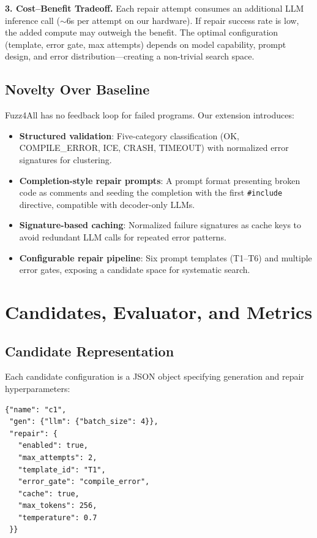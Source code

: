 \documentclass[conference]{IEEEtran}
\begin{document}
\textbf{3. Cost--Benefit Tradeoff.} Each repair attempt consumes an additional LLM inference call ($\sim$6s per attempt on our hardware). If repair success rate is low, the added compute may outweigh the benefit. The optimal configuration (template, error gate, max attempts) depends on model capability, prompt design, and error distribution---creating a non-trivial search space.

\subsection{Novelty Over Baseline}

Fuzz4All has no feedback loop for failed programs. Our extension introduces:
\begin{itemize}
    \item \textbf{Structured validation}: Five-category classification (OK, COMPILE\_ERROR, ICE, CRASH, TIMEOUT) with normalized error signatures for clustering.
    \item \textbf{Completion-style repair prompts}: A prompt format presenting broken code as comments and seeding the completion with the first \texttt{\#include} directive, compatible with decoder-only LLMs.
    \item \textbf{Signature-based caching}: Normalized failure signatures as cache keys to avoid redundant LLM calls for repeated error patterns.
    \item \textbf{Configurable repair pipeline}: Six prompt templates (T1--T6) and multiple error gates, exposing a candidate space for systematic search.
\end{itemize}

\section{Candidates, Evaluator, and Metrics}

\subsection{Candidate Representation}

Each candidate configuration is a JSON object specifying generation and repair hyperparameters:

\begin{lstlisting}
{"name": "c1",
 "gen": {"llm": {"batch_size": 4}},
 "repair": {
   "enabled": true,
   "max_attempts": 2,
   "template_id": "T1",
   "error_gate": "compile_error",
   "cache": true,
   "max_tokens": 256,
   "temperature": 0.7
 }}
\end{lstlisting}
\end{document}
